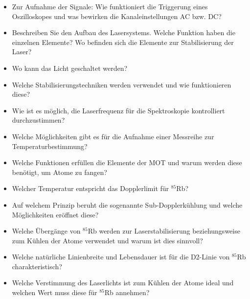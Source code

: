 \documentclass[
class=book,
accentcolor=1b,
custommargins=geometry,
fontsize=11pt,
thesis={type=Versuchsanleitung},
ruledheaders=all,
headline=false,
instbox=false,
marginpar=false,
title=small,
ignore-missing-data=true,
twoside=false,
pdfa=false %
]{apqpub}
\begin{document}
					\begin{itemize}
						\item Zur Aufnahme der Signale: Wie funktioniert die Triggerung eines Oszilloskopes und was bewirken die Kanaleinstellungen AC bzw. DC? 
						
						\item Beschreiben Sie den Aufbau des Lasersystems. Welche Funktion haben die einzelnen Elemente? Wo befinden sich die Elemente zur Stabilisierung der Laser? 
						
						\item Wo kann das Licht geschaltet werden?
						
						\item Welche Stabilisierungstechniken werden verwendet und wie funktionieren diese?
						
						\item Wie ist es möglich, die Laserfrequenz für die Spektroskopie kontrolliert durchzustimmen?
						
						\item Welche Möglichkeiten gibt es für die Aufnahme einer Messreihe zur Temperaturbestimmung?
						
						\item Welche Funktionen erfüllen die Elemente der MOT und warum werden diese benötigt, um Atome zu fangen?
						
						\item Welcher Temperatur entspricht das Dopplerlimit für $^{85}$Rb?
						
						\item Auf welchem Prinzip beruht die sogenannte Sub-Dopplerkühlung und welche Möglichkeiten eröffnet diese?
						
						\item Welche Übergänge von $^{85}$Rb werden zur Laserstabilisierung beziehungsweise zum Kühlen der Atome verwendet und warum ist dies sinnvoll?
						
						\item Welche natürliche Linienbreite und Lebensdauer ist für die D2-Linie von $^{85}$Rb charakteristisch?
						
						\item Welche Verstimmung des Laserlichts ist zum Kühlen der Atome ideal und welchen Wert muss diese für $^{85}$Rb annehmen?
						
						
					\end{itemize}
					
					
					
\end{document}
